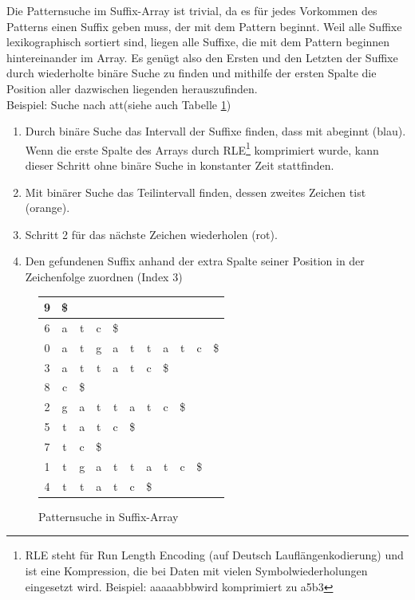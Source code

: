 Die Patternsuche im Suffix-Array ist trivial, da es für jedes Vorkommen des Patterns einen Suffix geben muss, der mit dem Pattern beginnt.
Weil alle Suffixe lexikographisch sortiert sind, liegen alle Suffixe, die mit dem Pattern beginnen hintereinander im Array.
Es genügt also den Ersten und den Letzten der Suffixe durch wiederholte binäre Suche zu finden und mithilfe der ersten Spalte die Position aller dazwischen liegenden herauszufinden.
\\
Beispiel: Suche nach \glqq att\grqq (siehe auch Tabelle \ref{tbl:suffix-array-search})
\begin{enumerate}
	\item Durch binäre Suche das Intervall der Suffixe finden, dass mit \glqq a\grqq beginnt (blau).
		Wenn die erste Spalte des Arrays durch RLE\footnote{RLE steht für Run Length Encoding (auf Deutsch Lauflängenkodierung) und ist eine Kompression, die bei Daten mit vielen Symbolwiederholungen eingesetzt wird. Beispiel: \glqq aaaaabbb\grqq wird komprimiert zu \glqq a5b3\grqq}
		komprimiert wurde, kann dieser Schritt ohne binäre Suche in konstanter Zeit stattfinden.
	\item Mit binärer Suche das Teilintervall finden, dessen zweites Zeichen \glqq t\grqq ist (orange).
	\item Schritt 2 für das nächste Zeichen wiederholen (rot).
	\item Den gefundenen Suffix anhand der extra Spalte seiner Position in der Zeichenfolge zuordnen (Index 3)
\end{enumerate}

\begin{figure}[h]
	\begin{center}
		\begin{tabular}{ c || c c c c c c c c c c | }
			\hline
			9 & \$ &   &   &   &   &   &   &   &   &   \\
			\hline
			6 & \cellcolor{SkyBlue} a & \cellcolor{BurntOrange} t & c & \$ &   &   &   &   &   &   \\
			\hline
			0 & \cellcolor{SkyBlue} a & \cellcolor{BurntOrange} t & g & a & t & t & a & t & c & \$ \\
			\hline
			3 & \cellcolor{SkyBlue} a & \cellcolor{BurntOrange} t & \cellcolor{RubineRed} t & a & t & c & \$ &   &   &   \\
			\hline
			8 & c & \$ &   &   &   &   &   &   &   &   \\
			\hline
			2 & g & a & t & t & a & t & c & \$ &   &   \\
			\hline
			5 & t & a & t & c & \$ &   &   &   &   &   \\
			\hline
			7 & t & c & \$ &   &   &   &   &   &   &   \\
			\hline
			1 & t & g & a & t & t & a & t & c & \$ &   \\
			\hline
			4 & t & t & a & t & c & \$ &   &   &   &   \\
			\hline
		\end{tabular}
		\caption{Patternsuche in Suffix-Array}
		\label{tbl:suffix-array-search}
	\end{center}
\end{figure}

